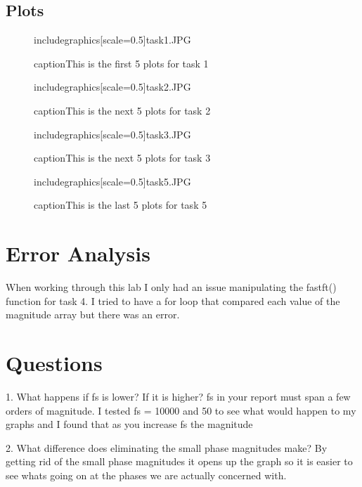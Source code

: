 \documentclass[12pt]{report}
\begin{document}
\subsection{Plots}
\begin{figure}[]

includegraphics[scale=0.5]{task1.JPG} 

  caption{This is the first 5 plots for task 1}

\end{figure}
\begin{figure}[]

includegraphics[scale=0.5]{task2.JPG} 

  caption{This is the next 5 plots for task 2}

\end{figure}
\begin{figure}[]

includegraphics[scale=0.5]{task3.JPG} 

  caption{This is the next 5 plots for task 3}

\end{figure}
\begin{figure}[]

includegraphics[scale=0.5]{task5.JPG} 

  caption{This is the last 5 plots for task 5}

\end{figure}
\section{Error Analysis}

When working through this lab I only had an issue manipulating the fastft() function for task 4. I tried to have a for loop that compared each value of the magnitude array but there was an error. 

\section{Questions}

1. What happens if fs is lower? If it is higher? fs in your report must span a few orders of
magnitude.
I tested fs = 10000 and 50 to see what would happen to my graphs and I found that as you increase fs the magnitude 

2. What difference does eliminating the small phase magnitudes make?
By getting rid of the small phase magnitudes it opens up the graph so it is easier to see whats going on at the phases we are actually concerned with.
\end{document}
